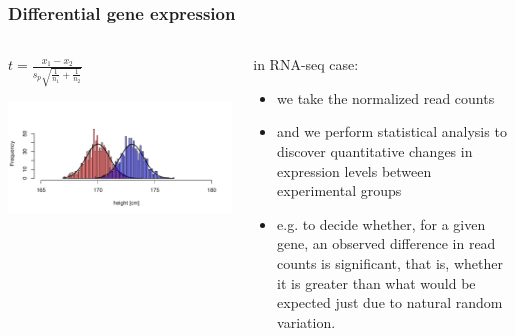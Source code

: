 \documentclass{beamer}\usepackage[]{graphicx}\usepackage[]{color}
\makeatletter
\def\maxwidth{ %
  \ifdim\Gin@nat@width>\linewidth
    \linewidth
  \else
    \Gin@nat@width
  \fi
}
\newenvironment{knitrout}{}{} %
\makeatother
\begin{document}
\begin{frame}
\frametitle{Differential gene expression}
\begin{columns}
\begin{column}{0.48\textwidth}
\begin{flushright}
\footnotesize
$t=\frac{x_1-x_2}{s_p\sqrt{\frac{1}{n_1}+\frac{1}{n_2}}}$
\end{flushright}
\begin{knitrout}
\color{fgcolor}
\includegraphics[width=\maxwidth]{figure/ttest-1} 

\end{knitrout}
\end{column}
\begin{column}{0.48\textwidth}
\footnotesize
in RNA-seq case:
\begin{itemize}
\item we take the normalized read counts 
\item and we perform statistical analysis to discover quantitative changes in expression levels between experimental groups
\item e.g. to decide whether, for a given gene, an observed difference in read counts is significant, that is, whether it is greater than what would be expected just due to natural random variation.
\end{itemize}
\end{column}
\end{columns}
\end{frame}
\end{document}
